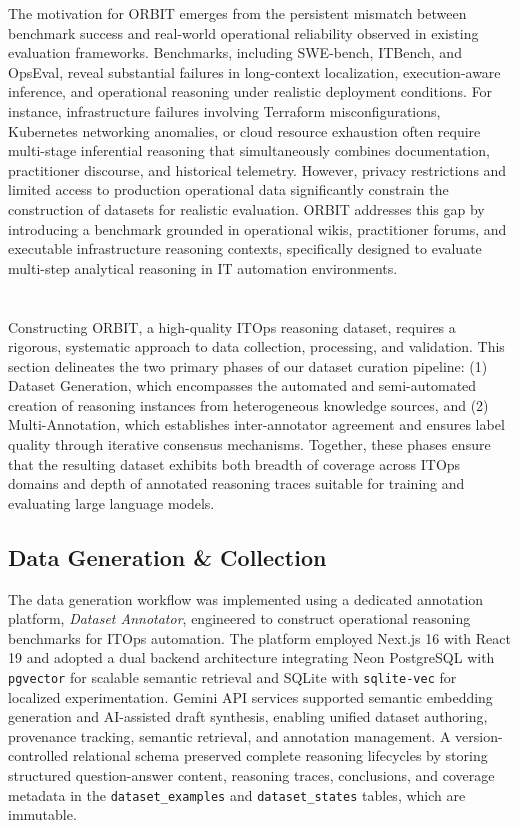 \documentclass[conference]{IEEEtran}
\begin{document}
The motivation for ORBIT emerges from the persistent mismatch between benchmark success and real-world operational reliability observed in existing evaluation frameworks. Benchmarks, including SWE-bench, ITBench, and OpsEval, reveal substantial failures in long-context localization, execution-aware inference, and operational reasoning under realistic deployment conditions. For instance, infrastructure failures involving Terraform misconfigurations, Kubernetes networking anomalies, or cloud resource exhaustion often require multi-stage inferential reasoning that simultaneously combines documentation, practitioner discourse, and historical telemetry. However, privacy restrictions and limited access to production operational data significantly constrain the construction of datasets for realistic evaluation. ORBIT addresses this gap by introducing a benchmark grounded in operational wikis, practitioner forums, and executable infrastructure reasoning contexts, specifically designed to evaluate multi-step analytical reasoning in IT automation environments.

\section{}\label{sec4}

Constructing ORBIT, a high-quality ITOps reasoning dataset, requires a rigorous, systematic approach to data collection, processing, and validation. This section delineates the two primary phases of our dataset curation pipeline: (1) Dataset Generation, which encompasses the automated and semi-automated creation of reasoning instances from heterogeneous knowledge sources, and (2) Multi-Annotation, which establishes inter-annotator agreement and ensures label quality through iterative consensus mechanisms. Together, these phases ensure that the resulting dataset exhibits both breadth of coverage across ITOps domains and depth of annotated reasoning traces suitable for training and evaluating large language models.

\subsection{Data Generation \& Collection}

The data generation workflow was implemented using a dedicated annotation platform, \textit{Dataset Annotator}, engineered to construct operational reasoning benchmarks for ITOps automation. The platform employed Next.js 16 with React 19 and adopted a dual backend architecture integrating Neon PostgreSQL with \texttt{pgvector} for scalable semantic retrieval and SQLite with \texttt{sqlite-vec} for localized experimentation. Gemini API services supported semantic embedding generation and AI-assisted draft synthesis, enabling unified dataset authoring, provenance tracking, semantic retrieval, and annotation management. A version-controlled relational schema preserved complete reasoning lifecycles by storing structured question-answer content, reasoning traces, conclusions, and coverage metadata in the \texttt{dataset\_examples} and \texttt{dataset\_states} tables, which are immutable.
\end{document}
